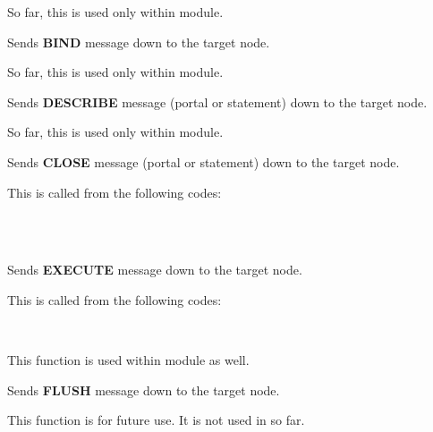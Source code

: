       So far, this is used only within  module.
  
  
      Sends \textbf{BIND} message down to the target node.
      
      So far, this is used only within  module.
  
  
      Sends  \textbf{DESCRIBE} message (portal or statement) down to the target node.
      
      So far, this is used only within  module.
  
  
      Sends \textbf{CLOSE} message (portal or statement) down to the target node.
      
      This is called from the following codes:
      
      \FuncRefHdr
		  \\ \vspace{3pt}
		  \\ \hline
      \FuncRefTrailor
  
  
      Sends \textbf{EXECUTE} message down to the target node.
      
      This is called from the following codes:
      
      \FuncRefHdr
		  \\ \hline
      \FuncRefTrailor
      
      This function is used within  module as well.
  
  
      Sends \textbf{FLUSH} message down to the target node.
      
      This function is for future use.   It is not used in \XC{} so far.
  
